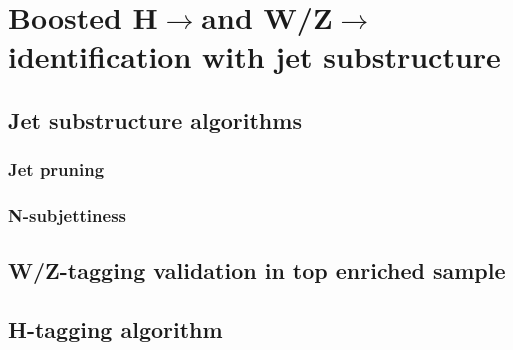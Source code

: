 \chapter{Boosted H$\rightarrow$\bbbar and W/Z$\rightarrow$\qqbarpr identification with jet substructure}

\section{Jet substructure algorithms}
\subsection{Jet pruning}
\subsection{N-subjettiness}

\section{W/Z-tagging validation in top enriched sample}

\section{H-tagging algorithm}